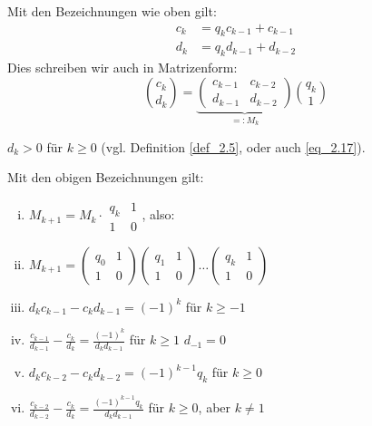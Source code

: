 \begin{falko} \label{F2.6}
	Mit den Bezeichnungen wie oben gilt:
	\begin{equation}
	\begin{aligned}
		c_k &= q_k c_{k-1} + c_{k-1} \\	\label{eq_2.17}
		d_k &= q_k d_{k-1} + d_{k-2}
	\end{aligned}
	\end{equation}
	Dies schreiben wir auch in Matrizenform:
	\begin{equation}
		\binom{c_k}{d_k} = \underbrace{\begin{pmatrix}
		c_{k-1} & c_{k-2} \\ 
		d_{k-1} & d_{k-2}
		\end{pmatrix}}_{=:M_k} \binom{q_k}{1}
	\end{equation}
\end{falko}

	$d_k > 0$ für $k \geq 0$ (vgl. Definition \ref{def_2.5}, oder auch \eqref{eq_2.17}).
	
\begin{falko} \label{F2.7}
	Mit den obigen Bezeichnungen gilt: 
	\begin{enumerate}[(i)]
		\item $M_{k+1} = M_k \cdot \begin{matrix}
			q_k & 1 \\ 1 & 0 
		\end{matrix}$, also:
		\item $M_{k+1} = \begin{pmatrix} q_0 & 1 \\ 1 & 0 \end{pmatrix} \begin{pmatrix} q_1 & 1 \\ 1 & 0 \end{pmatrix} \dots \begin{pmatrix} q_k & 1 \\ 1 & 0 \end{pmatrix}$
		\item $d_kc_{k-1} - c_kd_{k-1} = (-1)^k$ für $k \geq -1$
		\item $\frac{c_{k-1}}{d_{k-1}} - \frac{c_k}{d_k} = \frac{(-1)^k}{d_k d_{k-1}}$ für $k \geq 1$ \hfill $d_{-1} = 0$
		\item $d_kc_{k-2} - c_kd_{k-2} = (-1)^{k-1} q_k$ für $k \geq 0$
		\item $\frac{c_{k-2}}{d_{k-2}} - \frac{c_k}{d_k} = \frac{(-1)^{k-1} q_k}{d_k d_{k-1}}$ für $k \geq 0$, aber $k \neq 1$
	\end{enumerate}
\end{falko}

